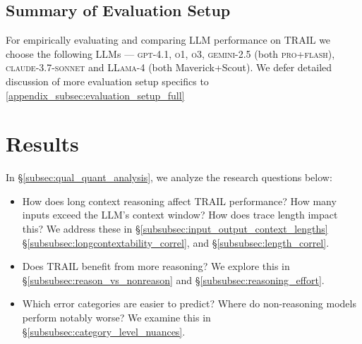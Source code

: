 \documentclass[11pt]{article}
\begin{document}
\subsection{Summary of Evaluation Setup}
\label{subsec:evaluation_setup_summ}
For empirically evaluating and comparing LLM performance on \textsc{TRAIL} we choose the following LLMs --- \textsc{gpt-4.1}, \textsc{o1}, \textsc{o3}, \textsc{gemini-2.5} (both \textsc{pro}+\textsc{flash}), \textsc{claude-3.7-sonnet} and \textsc{LLama-4} (both Maverick+Scout). We defer detailed discussion of more evaluation setup specifics to \ref{appendix_subsec:evaluation_setup_full}

\section{Results}

In \S\ref{subsec:qual_quant_analysis}, we analyze the research questions below:
\begin{itemize}[itemsep=1mm, parsep=0.5pt]
\item How does long context reasoning affect TRAIL performance? How many inputs exceed the LLM's context window? How does trace length impact this? We address these in \S\ref{subsubsec:input_output_context_lengths} \S\ref{subsubsec:longcontextability_correl},  and \S\ref{subsubsec:length_correl}.
\item Does TRAIL benefit from more reasoning? We explore this in \S\ref{subsubsec:reason_vs_nonreason} and \S\ref{subsubsec:reasoning_effort}.
\item Which error categories are easier to predict? Where do non-reasoning models perform notably worse? We examine this in \S\ref{subsubsec:category_level_nuances}.
\end{itemize}
\end{document}
